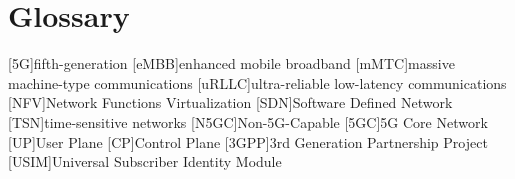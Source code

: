 \chapter{Glossary}

\footnotesize
\SingleSpacing

\begin{multicols}{2}
\begin{acronym}[AAAAAA]

	[5G]{fifth-generation}
	[eMBB]{enhanced mobile broadband}
	[mMTC]{massive machine-type communications}
	[uRLLC]{ultra-reliable low-latency communications}
	[NFV]{Network Functions Virtualization}
	[SDN]{Software Defined Network}
	[TSN]{time-sensitive networks}
	[N5GC]{Non-5G-Capable}
	[5GC]{5G Core Network}
	[UP]{User Plane}
	[CP]{Control Plane}
	[3GPP]{3rd Generation Partnership Project}
	[USIM]{Universal Subscriber Identity Module}

\end{acronym}
\end{multicols}


